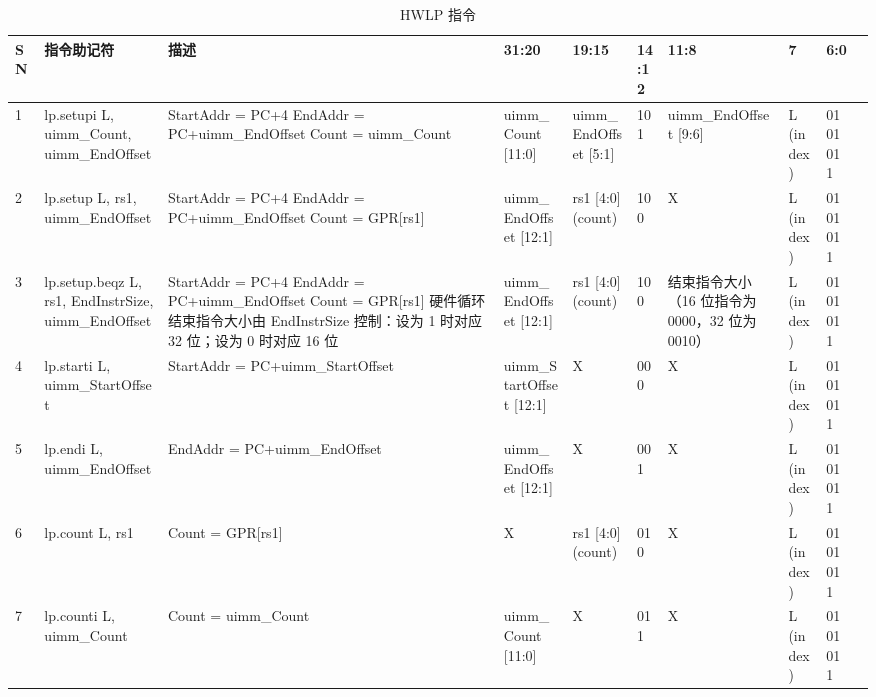 \documentclass[main\_\_CN.tex]{subfiles}
\begin{document}
\begin{landscape}
\begin{table}[H]
    \caption{HWLP 指令}
    \label{tab:riscvcpu-hwlp-instr}
    \begin{tabular}{|p{0.3cm}|p{2.5cm}|p{6cm}|p{2.5cm}|p{2.5cm}|p{1cm}|p{2.5cm}|p{2cm}|p{2cm}|p{2cm}|}
        \hline\rowcolor{lightgray}
        \textbf{SN} & \textbf{指令助记符} & \textbf{描述} & \textbf{31:20} & \textbf{19:15} & \textbf{14:12}  & \textbf{11:8} & \textbf{7} & \textbf{6:0} \\
        \hline
        1 & lp.setupi L, uimm\_Count, uimm\_EndOffset & StartAddr = PC+4 \newline EndAddr = PC+uimm\_EndOffset \newline Count = uimm\_Count & uimm\_Count [11:0] & uimm\_EndOffset [5:1] &  101 & uimm\_EndOffset [9:6] & L (index) & 0101011\\
        \hline
        2 & lp.setup L, rs1, uimm\_EndOffset & StartAddr = PC+4 \newline EndAddr = PC+uimm\_EndOffset \newline Count = GPR[rs1] & uimm\_EndOffset [12:1]  & rs1 [4:0] (count) & 100 & X & L (index) & 0101011 \\
        \hline
        3 & lp.setup.beqz L, rs1, EndInstrSize, uimm\_EndOffset & StartAddr = PC+4 \newline EndAddr = PC+uimm\_EndOffset \newline Count = GPR[rs1] \newline 硬件循环结束指令大小由 EndInstrSize 控制：设为 1 时对应 32 位；设为 0 时对应 16 位& uimm\_EndOffset [12:1]  & rs1 [4:0] (count) & 100 & 结束指令大小（16 位指令为 0000，32 位为 0010） & L (index) & 0101011 \\
        \hline
        4 & lp.starti L, uimm\_StartOffset & StartAddr = PC+uimm\_StartOffset  & uimm\_StartOffset [12:1] & X & 000 & X & L (index) & 0101011 \\
        \hline
        5 & lp.endi L, uimm\_EndOffset & EndAddr = PC+uimm\_EndOffset & uimm\_EndOffset [12:1] & X & 001 & X & L (index) & 0101011\\
        \hline
        6 & lp.count L, rs1 & Count = GPR[rs1] & X & rs1 [4:0] (count) & 010 & X & L (index) & 0101011\\
        \hline
        7 & lp.counti L, uimm\_Count & Count = uimm\_Count & uimm\_Count [11:0] & X & 011 & X & L (index) & 0101011\\
        \hline
    \end{tabular}
\end{table}

\end{landscape}
\restoregeometry
\clearpage
\end{document}
